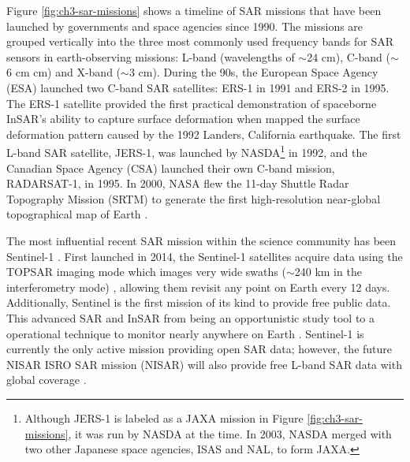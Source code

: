 Figure \ref{fig:ch3-sar-missions} shows a timeline of SAR missions that have been launched by governments and space agencies since 1990. The missions are grouped vertically into the three most commonly used frequency bands for SAR sensors in earth-observing missions: L-band (wavelengths of $\sim$24 cm), C-band ($\sim$6 cm cm) and X-band ($\sim$3 cm).
During the 90s, the European Space Agency (ESA) launched two C-band SAR satellites: ERS-1 in 1991 and ERS-2 in 1995. The ERS-1 satellite provided the first practical demonstration of spaceborne InSAR's ability to capture surface deformation
when \cite{Massonnet1993DisplacementFieldLanders} mapped the surface deformation pattern caused by the 1992 Landers, California earthquake. The first L-band SAR satellite, JERS-1, was launched by NASDA\footnote{Although JERS-1 is labeled as a JAXA mission in Figure \ref{fig:ch3-sar-missions}, it was run by NASDA at the time. In 2003, NASDA merged with two other Japanese space agencies, ISAS and NAL, to form JAXA.} in 1992, and the Canadian Space Agency (CSA) launched their own C-band mission, RADARSAT-1, in 1995. In 2000, NASA flew the 11-day Shuttle Radar Topography Mission (SRTM) to generate the first high-resolution near-global topographical map of Earth \citep{Farr2007ShuttleRadarTopography}.

The most influential recent SAR mission within the science community has been Sentinel-1 \citep{Torres2012GmesSentinel1}. First launched in 2014, the Sentinel-1 satellites acquire data using the TOPSAR imaging mode which images very wide swaths ($\sim$240 km in the interferometry mode) \cite{Zan2006TopsarTerrainObservation}, allowing them revisit any point on Earth every 12 days.  Additionally, Sentinel is the first mission of its kind to provide free public data. This advanced SAR and InSAR from being an opportunistic study tool to  a operational technique to monitor nearly anywhere on Earth  \cite{Rosen2021ShiftingGround}. Sentinel-1 is currently the only active mission providing open SAR data; however, the future NISAR ISRO SAR mission (NISAR) will also provide free L-band SAR data with global coverage \citep{Rosen2015NasaIsroSar}.


